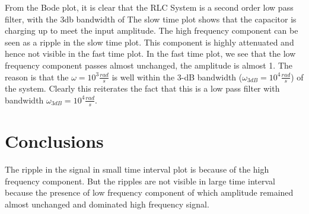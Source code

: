 \documentclass[11pt, a4paper]{article}
\begin{document}
{
From the Bode plot, it is clear that the RLC System is a second order low pass filter, with the 3db bandwidth of 
The slow time plot shows that the capacitor is charging up to meet the input amplitude. The high frequency component can be seen as a ripple in the slow time plot.  This component is highly attenuated and hence not visible in the fast time plot.
In the fast time plot, we see that the low frequency component passes almost unchanged, the amplitude is almost 1.
The reason is that the $\omega = 10^3\frac{rad}{s}$ is well within the 3-dB bandwidth ($\omega_{3dB} = 10^4\frac{rad}{s}$) of the system.
Clearly this reiterates the fact that this is a low pass filter with bandwidth $\omega_{3dB} = 10^4\frac{rad}{s}$.

}

\section{Conclusions}
The ripple in the signal in small time interval plot is because of the high frequency component. But the ripples
are not visible in large time interval because the presence of low frequency component of which amplitude
remained almost unchanged and dominated high frequency signal.
\end{document}
